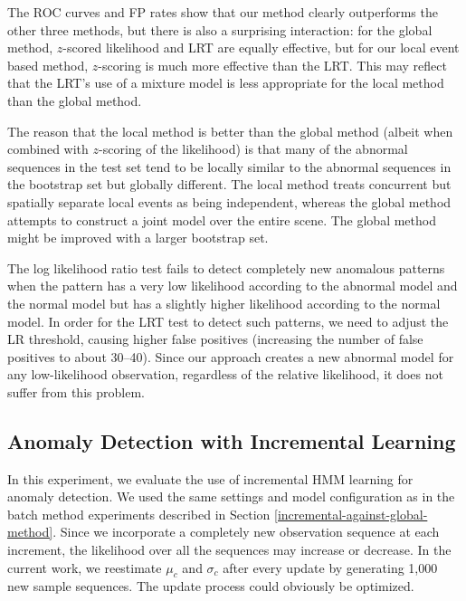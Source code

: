 The ROC curves and FP rates show that our method clearly outperforms
the other three methods, but there is also a surprising interaction:
for the global method, $z$-scored likelihood and LRT are equally
effective, but for our local event based method, $z$-scoring is much
more effective than the LRT.  This may reflect that the LRT's use of a
mixture model is less appropriate for the local method than the global
method.

The reason that the local method is better than the global method
(albeit when combined with $z$-scoring of the likelihood) is that many
of the abnormal sequences in the test set tend to be locally similar
to the abnormal sequences in the bootstrap set but globally
different. The local method treats concurrent but spatially separate
local events as being independent, whereas the global method attempts
to construct a joint model over the entire scene.  The global method
might be improved with a larger bootstrap set.


The log likelihood ratio test fails to detect completely new anomalous
patterns when the pattern has a very low likelihood according to the
abnormal model and the normal model but has a slightly higher
likelihood according to the normal model. In order for the LRT test to
detect such patterns, we need to adjust the LR threshold, causing
higher false positives (increasing the number of false positives to
about 30--40).  Since our approach creates a new abnormal model for
any low-likelihood observation, regardless of the relative likelihood,
it does not suffer from this problem.

\subsection{Anomaly Detection with Incremental Learning}

In this experiment, we evaluate the use of incremental HMM learning
for anomaly detection. We used the same settings and model
configuration as in the batch method experiments described in Section
\ref{incremental-against-global-method}.  Since we incorporate a completely
new observation sequence at each increment, the likelihood over all
the sequences may increase or decrease. In the current work, we
reestimate $\mu_c$ and $\sigma_c$ after every update by generating
1,000 new sample sequences.  The update process could obviously be
optimized.


